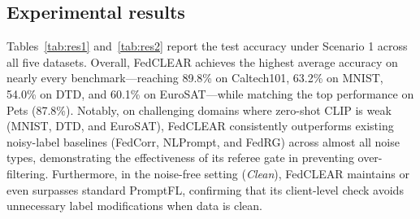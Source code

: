 \documentclass[runningheads]{llncs}
\begin{document}
\subsection{Experimental results}
Tables~\ref{tab:res1} and~\ref{tab:res2} report the test accuracy under Scenario 1 across all five datasets. Overall, FedCLEAR achieves the highest average accuracy on nearly every benchmark—reaching 89.8\% on Caltech101, 63.2\% on MNIST, 54.0\% on DTD, and 60.1\% on EuroSAT—while matching the top performance on Pets (87.8\%). Notably, on challenging domains where zero-shot CLIP is weak (MNIST, DTD, and EuroSAT), FedCLEAR consistently outperforms existing noisy-label baselines (FedCorr, NLPrompt, and FedRG) across almost all noise types, demonstrating the effectiveness of its referee gate in preventing over-filtering. Furthermore, in the noise-free setting (\emph{Clean}), FedCLEAR maintains or even surpasses standard PromptFL, confirming that its client-level check avoids unnecessary label modifications when data is clean.
\begin{table}[H]
\centering
\caption{Test accuracy (\%) in the first scenario (clean and noisy clients): mean of the last 10 rounds over 5 seeds. Among the trained methods, the best result in each column is in bold and the second best is underlined; ZS-CLIP does not use training labels, is shown for reference and is not ranked.}
\label{tab:res1}
\setlength{\tabcolsep}{3pt}
\end{table}
\end{document}

